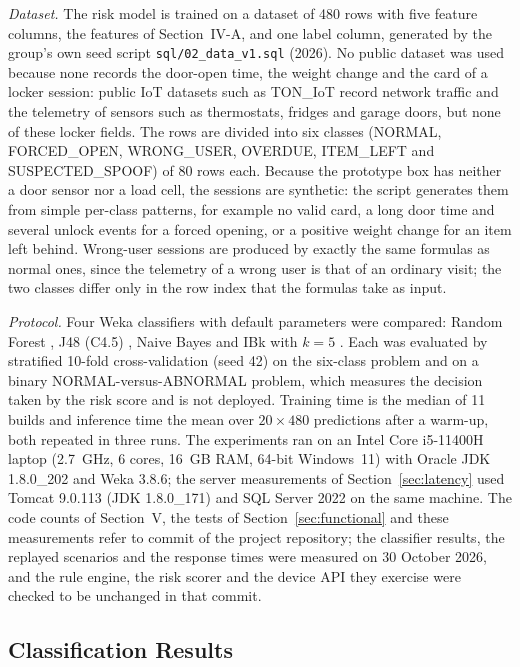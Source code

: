 \textit{Dataset.} The risk model is trained on a dataset of 480 rows with five feature columns, the features of
Section~IV-A, and one label column, generated by the group's own seed script \texttt{sql/02\_data\_v1.sql} (2026). No
public dataset was used because none records the door-open time, the weight change and the card of a locker session:
public IoT datasets such as TON\_IoT \cite{moustafa2021toniot} record network traffic and the telemetry of sensors
such as thermostats, fridges and garage doors, but none of these locker fields. The rows are divided into six classes
(NORMAL, FORCED\_OPEN, WRONG\_USER, OVERDUE, ITEM\_LEFT and SUSPECTED\_SPOOF) of 80 rows each. Because the prototype
box has neither a door sensor nor a load cell, the sessions are synthetic: the script generates them from simple
per-class patterns, for example no valid card, a long door time and several unlock events for a forced opening, or a
positive weight change for an item left behind. Wrong-user sessions are produced by exactly the same formulas as
normal ones, since the telemetry of a wrong user is that of an ordinary visit; the two classes differ only in the row
index that the formulas take as input.

\textit{Protocol.} Four Weka classifiers with default parameters were compared: Random Forest \cite{breiman2001rf},
J48 (C4.5) \cite{quinlan1993c45}, Naive Bayes \cite{john1995nb} and IBk with $k = 5$ \cite{aha1991ibl}. Each was
evaluated by stratified 10-fold cross-validation \cite{kohavi1995cv} (seed 42) on the six-class problem and on a binary
NORMAL-versus-ABNORMAL problem, which measures the decision taken by the risk score and is not deployed. Training time
is the median of 11 builds and inference time the mean over $20 \times 480$ predictions after a warm-up, both repeated
in three runs. The experiments ran on an Intel Core i5-11400H laptop (2.7~GHz, 6 cores, 16~GB RAM, 64-bit Windows~11)
with Oracle JDK 1.8.0\_202 and Weka 3.8.6; the server measurements of Section~\ref{sec:latency} used Tomcat 9.0.113 (JDK
1.8.0\_171) and SQL Server 2022 on the same machine. The code counts of Section~V, the tests of Section~\ref{sec:functional} and these measurements refer to commit
\texttt{\measurecommit} of the project repository; the classifier results, the replayed scenarios and the response times
were measured on 30 October 2026, and the rule engine, the risk scorer and the device API they exercise were checked to
be unchanged in that commit.

\subsection{Classification Results}

